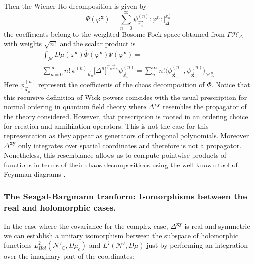 \documentclass{elsarticle}%
\begin{document}
  Then the Wiener-Ito decomposition is given by
    \begin{equation}
        \label{eq:realwienerIto}
        \Psi(\varphi^\mathbf{x})=\sum_{n=0}^\infty \psi^{(n)}_{\vec{x_n}}:\varphi^n:\lvert_\Delta^{\vec{{x}_n}}
    \end{equation}
 the coefficients belong to the weighted Bosonic Fock space obtained from $\Gamma\mathcal{H}_\Delta$ with weights $\sqrt{n!}$ and the scalar product is 
\begin{multline}
    \label{eq:complexchaosprod}
    \int_{\mathcal{N}}D\mu(\varphi^\mathbf{x})\overline{\Phi}(\varphi^\mathbf{x})\Psi(\varphi^\mathbf{x})
    = \\   \sum_{n=0}^\infty n!\ \overline{\phi^{(n)}}_{\vec{u}_n}\big[\Delta^n\big]^{\vec{u}_n\vec{x}_n}  \psi^{(n)}_{\vec{x}_n}
    = 
    \sum_{n,}^\infty n! \big\langle\phi^{(n)}_{\vec{\mathbf{x}}_n},\psi^{(n)}_{\vec{\mathbf{x}}_n}\big\rangle_{\mathcal{H}^{n}_\Delta}
    \end{multline}
    Here $\phi^{(n)}_{{\vec{\mathbf{x}}_n}}$ represent the coefficients of the chaos decomposition of $\Phi$.
    Notice that this recursive definition of Wick powers coincides with the usual prescription for normal ordering in quantum field theory where $\Delta^{\mathbf{xy}}$ resembles the propagator of the theory considered. However, that prescription is rooted in an ordering choice for creation and annihilation operators. This is not the case for this representation as they appear as generators of orthogonal polynomials. Moreover $\Delta^{\mathbf{xy}}$ only integrates over spatial coordinates and therefore is not a propagator.  Nonetheless,  this resemblance allows us to compute pointwise products of functions in terms of their chaos decompositions using the well known tool of Feynman diagrams \cite{moshayediQuantumField2019}.


    \subsubsection{The Seagal-Bargmann tranform: Isomorphisms between the real and holomorphic cases.}
    In the case where the covariance for the complex case, $\Delta^{\mathbf{xy}}$ is real and symmetric we can establish a unitary isomorphism between the subspace of holomorphic functions $L^2_{Hol}(\mathcal{N}'_{\mathbb{C}},D\mu_c)$ and  $L^2(\mathcal{N}',D\mu)$ just by performing an integration over the imaginary part of the coordinates:    
\end{document}
